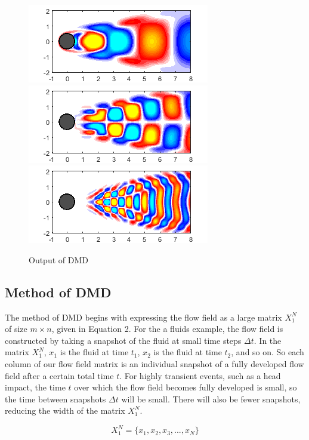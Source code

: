 \documentclass[%
 aip,
 amsmath,amssymb,
 reprint,%
 floatfix,%
]{revtex4-1}
\begin{document}
\begin{figure}
	\centering
	\includegraphics[scale=1]{examplemodes1.png}
	\includegraphics[scale=1]{examplemodes2.png}
	\includegraphics[scale=1]{examplemodes3.png}
	\caption{Output of DMD}
\end{figure}

\subsection{Method of DMD}

The method of DMD begins with expressing the flow field as a large matrix $X_1^N$ of size $m \times n$, given in Equation 2. For the a fluids example, the flow field is constructed by taking a snapshot of the fluid at small time steps $\Delta t$. In the matrix $X_1^N$, $x_1$ is the fluid at time $t_1$, $x_2$ is the fluid at time $t_2$, and so on. So each column of our flow field matrix is an individual snapshot of a fully developed flow field after a certain total time $t$. For highly transient events, such as a head impact, the time $t$ over which the flow field becomes fully developed is small, so the time between snapshots $\Delta t$ will be small. There will also be fewer snapshots, reducing the width of the matrix $X_1^N$.

\begin{equation}
	X_1^N = \{ x_1, x_2, x_3, ..., x_N \}
\end{equation}
\end{document}

